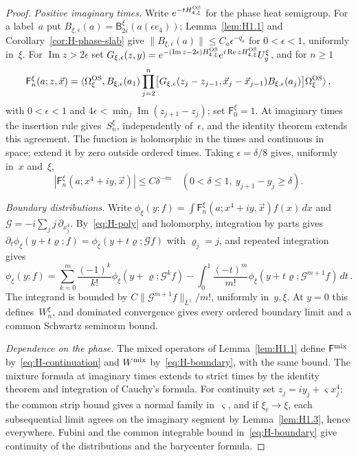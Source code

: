 \begin{proof}
\emph{Positive imaginary times.} Write $e^{-tH_{4,\xi}^{\rm OS}}$ for the phase heat semigroup. For a label~$a$ put $B_{\xi,\epsilon}(a)=\mathsf B_{2\epsilon}^\xi(a(\epsilon e_4))$; Lemma~\ref{lem:H1.1} and Corollary~\ref{cor:H-phase-slab} give $\|B_{\xi,\epsilon}(a)\|\le C_a\epsilon^{-q_a}$ for $0<\epsilon<1$, uniformly in~$\xi$. For $\operatorname{Im}z>2\epsilon$ set $G_{\xi,\epsilon}(z,y)=e^{-(\operatorname{Im}z-2\epsilon)H_{4,\xi}^{\rm OS}}e^{i\operatorname{Re}zH_{4,\xi}^{\rm OS}}U_y^\xi$, and for $n\ge1$
\begin{equation}\label{eq:H-continuation}
\mathsf F_n^\xi(a;z,\vec x)=\langle\Omega_\xi^{\rm OS},B_{\xi,\epsilon}(a_1)
\prod_{j=2}^n\bigl[G_{\xi,\epsilon}(z_j-z_{j-1},\vec x_j-\vec x_{j-1})B_{\xi,\epsilon}(a_j)\bigr]\Omega_\xi^{\rm OS}\rangle\,,
\end{equation}
with $0<\epsilon<1$ and $4\epsilon<\min_j\operatorname{Im}(z_{j+1}-z_j)$; set $\mathsf F_0^\xi=1$. At imaginary times the insertion rule gives~$S_n^\xi$, independently of~$\epsilon$, and the identity theorem extends this agreement. The function is holomorphic in the times and continuous in space; extend it by zero outside ordered times. Taking $\epsilon=\delta/8$ gives, uniformly in~$x$ and~$\xi$,
\begin{equation}\label{eq:H-poly}
|\mathsf F_n^\xi(a;x^4+iy,\vec x)|\le C\delta^{-m}
\quad\left(0<\delta\le1,\ y_{j+1}-y_j\ge\delta\right).
\end{equation}

\emph{Boundary distributions.} Write $\phi_\xi(y;f)=\int\mathsf F_n^\xi(a;x^4+iy,\vec x)f(x)\,dx$ and $\mathcal G=-i\sum_jj\,\partial_{x_j^4}$. By~\eqref{eq:H-poly} and holomorphy, integration by parts gives $\partial_t\phi_\xi(y+t\varrho;f)=\phi_\xi(y+t\varrho;\mathcal Gf)$ with $\varrho_j=j$, and repeated integration gives
\begin{equation}\label{eq:H-boundary}
\phi_\xi(y;f)=\sum_{k=0}^m\frac{(-1)^k}{k!}\phi_\xi(y+\varrho;\mathcal G^kf)
-\int_0^1\frac{(-t)^m}{m!}\phi_\xi(y+t\varrho;\mathcal G^{m+1}f)\,dt\,.
\end{equation}
The integrand is bounded by $C\|\mathcal G^{m+1}f\|_{L^1}/m!$, uniformly in~$y,\xi$. At $y=0$ this defines~$W_n^\xi$, and dominated convergence gives every ordered boundary limit and a common Schwartz seminorm bound.

\emph{Dependence on the phase.} The mixed operators of Lemma~\ref{lem:H1.1} define $\mathsf F^{\rm mix}$ by~\eqref{eq:H-continuation} and $W^{\rm mix}$ by~\eqref{eq:H-boundary}, with the same bound. The mixture formula at imaginary times extends to strict times by the identity theorem and integration of Cauchy's formula. For continuity set $z_j=iy_j+\varsigma x_j^4$; the common strip bound gives a normal family in~$\varsigma$, and if $\xi_\ell\to\xi$, each subsequential limit agrees on the imaginary segment by Lemma~\ref{lem:H1.3}, hence everywhere. Fubini and the common integrable bound in~\eqref{eq:H-boundary} give continuity of the distributions and the barycenter formula.


\end{proof}
